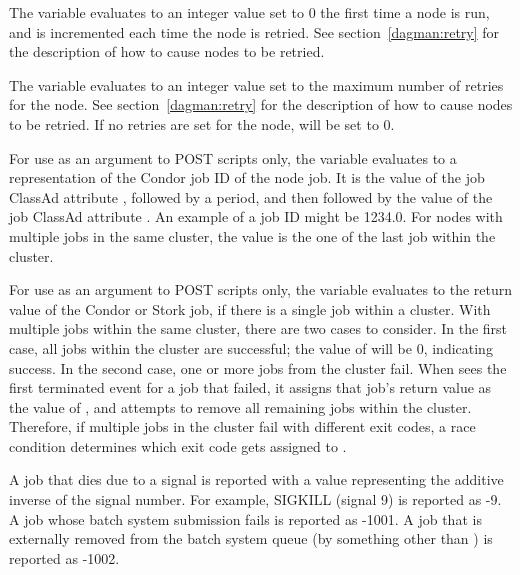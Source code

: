 \begin{itemize}
The variable  evaluates to an 
integer value set to 0 the first time a node is run,
and is  incremented each time the node is retried. 
See section~\ref{dagman:retry} for the description of how to cause
nodes to be retried. 

The variable  evaluates to an integer value set 
to the maximum number of retries for the node.
See section~\ref{dagman:retry} for the description of how to cause
nodes to be retried.  
If no retries are set for the node,
 will be set to 0.

For use as an argument to POST scripts only, the variable 
evaluates to a representation of the Condor job ID of the node job.
It is the value of the job ClassAd attribute ,
followed by a period,
and then followed by the value of the job ClassAd attribute .
An example of a job ID might be 1234.0.
For nodes with multiple jobs in the same cluster,
the  value is the one of the last job within the cluster.

For use as an argument to POST scripts only,
the  variable evaluates to the return value of the 
Condor or Stork job, if there is a single job within a cluster.
With multiple jobs within the same cluster,
there are two cases to consider.
In the first case, all jobs within the cluster are successful;
the value of  will be 0, indicating success.
In the second case,
one or more jobs from the cluster fail.
When  sees the first terminated event for a job that failed,
it assigns that job's return value as the value
of , and attempts to remove all remaining jobs within the cluster.
Therefore, if multiple jobs in the cluster fail with different exit codes,
a race condition determines which exit code gets assigned to .

A job that dies due to a signal is reported with a  value
representing the additive inverse of the signal number.
For example, SIGKILL (signal 9) is reported as -9.
A job whose batch system submission fails is reported as -1001.
A job that is externally removed from the batch system queue
(by something other than ) is reported as -1002.


\end{itemize}
